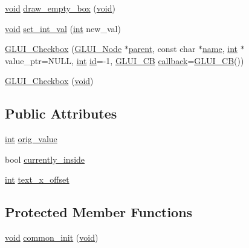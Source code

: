 \begin{DoxyCompactItemize}
\item 
\hyperlink{wglext_8h_a9e6b7f1933461ef318bb000d6bd13b83}{void} \hyperlink{class_g_l_u_i___checkbox_a477ff2ccc6f25ee1e3c8e16647af3e69}{draw\+\_\+empty\+\_\+box} (\hyperlink{wglext_8h_a9e6b7f1933461ef318bb000d6bd13b83}{void})
\item 
\hyperlink{wglext_8h_a9e6b7f1933461ef318bb000d6bd13b83}{void} \hyperlink{class_g_l_u_i___checkbox_a33a217485f0a8d17d7c45de5a91f57fd}{set\+\_\+int\+\_\+val} (\hyperlink{wglext_8h_a500a82aecba06f4550f6849b8099ca21}{int} new\+\_\+val)
\item 
\hyperlink{class_g_l_u_i___checkbox_a37dc0700283da8c9e05d57153f04e59b}{G\+L\+U\+I\+\_\+\+Checkbox} (\hyperlink{class_g_l_u_i___node}{G\+L\+U\+I\+\_\+\+Node} $\ast$\hyperlink{class_g_l_u_i___node_a8ed65d447784f6f88bd3e2e2bcac6cdb}{parent}, const char $\ast$\hyperlink{glext_8h_ad977737dfc9a274a62741b9500c49a32}{name}, \hyperlink{wglext_8h_a500a82aecba06f4550f6849b8099ca21}{int} $\ast$value\+\_\+ptr=N\+U\+L\+L, \hyperlink{wglext_8h_a500a82aecba06f4550f6849b8099ca21}{int} \hyperlink{glext_8h_a58c2a664503e14ffb8f21012aabff3e9}{id}=-\/1, \hyperlink{class_g_l_u_i___c_b}{G\+L\+U\+I\+\_\+\+C\+B} \hyperlink{class_g_l_u_i___control_a96060fe0cc6d537e736dd6eef78e24ab}{callback}=\hyperlink{class_g_l_u_i___c_b}{G\+L\+U\+I\+\_\+\+C\+B}())
\item 
\hyperlink{class_g_l_u_i___checkbox_ab84000529be3cf160f6e39c9416e782d}{G\+L\+U\+I\+\_\+\+Checkbox} (\hyperlink{wglext_8h_a9e6b7f1933461ef318bb000d6bd13b83}{void})
\end{DoxyCompactItemize}
\subsection*{Public Attributes}
\begin{DoxyCompactItemize}
\item 
\hyperlink{wglext_8h_a500a82aecba06f4550f6849b8099ca21}{int} \hyperlink{class_g_l_u_i___checkbox_a4b98b08b7a7aa76b9a2d11769c36afe0}{orig\+\_\+value}
\item 
bool \hyperlink{class_g_l_u_i___checkbox_a67719010e5421edee03a1a7c98dc34d0}{currently\+\_\+inside}
\item 
\hyperlink{wglext_8h_a500a82aecba06f4550f6849b8099ca21}{int} \hyperlink{class_g_l_u_i___checkbox_ac3cec38298f8c0f6a1573070c759fcbe}{text\+\_\+x\+\_\+offset}
\end{DoxyCompactItemize}
\subsection*{Protected Member Functions}
\begin{DoxyCompactItemize}
\item 
\hyperlink{wglext_8h_a9e6b7f1933461ef318bb000d6bd13b83}{void} \hyperlink{class_g_l_u_i___checkbox_abce9cded0f247b501c92b7037d7036e0}{common\+\_\+init} (\hyperlink{wglext_8h_a9e6b7f1933461ef318bb000d6bd13b83}{void})
\end{DoxyCompactItemize}
